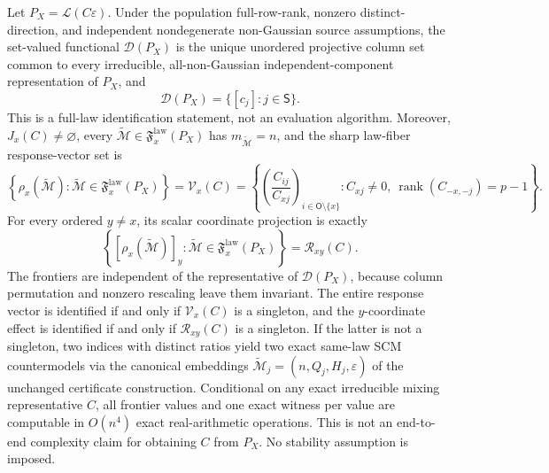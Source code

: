 Let \(P_X=\mathcal L(C\varepsilon)\). Under the population full-row-rank, nonzero distinct-direction, and independent nondegenerate non-Gaussian source assumptions, the set-valued functional \(\mathcal D(P_X)\) is the unique unordered projective column set common to every irreducible, all-non-Gaussian independent-component representation of \(P_X\), and
\[
 \mathcal D(P_X)=\{[c_j]:j\in\mathsf S\}.
\]
This is a full-law identification statement, not an evaluation algorithm. Moreover, \(J_x(C)\ne\varnothing\), every \(\widetilde{\mathcal M}\in\mathfrak F_x^{\mathrm{law}}(P_X)\) has \(m_{\widetilde{\mathcal M}}=n\), and the sharp law-fiber response-vector set is
\[
 \left\{\rho_x(\widetilde{\mathcal M}):\widetilde{\mathcal M}\in\mathfrak F_x^{\mathrm{law}}(P_X)\right\}
 =\mathcal V_x(C)
 =\left\{\left(\frac{C_{ij}}{C_{xj}}\right)_{i\in\mathsf O\setminus\{x\}}:C_{xj}\ne0,\ \operatorname{rank}(C_{-x,-j})=p-1\right\}.
\]
For every ordered \(y\ne x\), its scalar coordinate projection is exactly
\[
 \left\{[\rho_x(\widetilde{\mathcal M})]_y:\widetilde{\mathcal M}\in\mathfrak F_x^{\mathrm{law}}(P_X)\right\}
 =\mathcal R_{xy}(C).
\]
The frontiers are independent of the representative of \(\mathcal D(P_X)\), because column permutation and nonzero rescaling leave them invariant. The entire response vector is identified if and only if \(\mathcal V_x(C)\) is a singleton, and the \(y\)-coordinate effect is identified if and only if \(\mathcal R_{xy}(C)\) is a singleton. If the latter is not a singleton, two indices with distinct ratios yield two exact same-law SCM countermodels via the canonical embeddings \(\widetilde{\mathcal M}_j=(n,Q_j,H_j,\varepsilon)\) of the unchanged certificate construction. Conditional on any exact irreducible mixing representative \(C\), all frontier values and one exact witness per value are computable in \(O(n^4)\) exact real-arithmetic operations. This is not an end-to-end complexity claim for obtaining \(C\) from \(P_X\). No stability assumption is imposed.